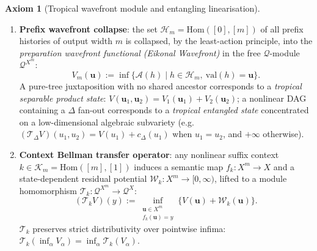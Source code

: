 \documentclass[11pt,a4paper]{article}
\theoremstyle{definition}
\newtheorem{axiom}{Axiom}[section]
\theoremstyle{remark}
\newcommand{\cA}{\mathcal{A}}
\newcommand{\cK}{\mathcal{K}}
\newcommand{\cW}{\mathcal{W}}
\newcommand{\cT}{\mathcal{T}}
\newcommand{\cH}{\mathcal{H}}
\newcommand{\cQ}{\mathcal{Q}}
\begin{document}
\begin{axiom}[Tropical wavefront module and entangling linearisation]
\label{ax:wavefront}
\begin{enumerate}
\item \textbf{Prefix wavefront collapse}: the set
$\cH_m = \mathrm{Hom}([0], [m])$ of all prefix histories of output width $m$ is
collapsed, by the least-action principle, into the \emph{preparation wavefront
functional (Eikonal Wavefront)} in the free $\cQ$-module $\cQ^{X^m}$:
\[
V_m(\mathbf{u}) := \inf \big\{ \cA(h) \mid h \in \cH_m,\ \mathrm{val}(h) =
\mathbf{u} \big\}.
\]
A pure-tree juxtaposition with no shared ancestor corresponds to a \emph{tropical
separable product state}: $V(\mathbf{u}_1, \mathbf{u}_2) = V_1(\mathbf{u}_1) +
V_2(\mathbf{u}_2)$; a nonlinear DAG containing a $\Delta$ fan-out corresponds to a
\emph{tropical entangled state} concentrated on a low-dimensional algebraic
subvariety (e.g.\ $(\cT_\Delta V)(u_1, u_2) = V(u_1) + c_\Delta(u_1)$ when
$u_1 = u_2$, and $+\infty$ otherwise).
\item \textbf{Context Bellman transfer operator}: any nonlinear suffix context
$k \in \cK_m = \mathrm{Hom}([m], [1])$ induces a semantic map $f_k: X^m \to X$
and a state-dependent residual potential $\cW_k: X^m \to [0, \infty)$, lifted to a
module homomorphism $\cT_k : \cQ^{X^m} \to \cQ^X$:
\[
(\cT_k V)(y) := \inf_{\substack{\mathbf{u} \in X^m \\ f_k(\mathbf{u}) = y}}
\big\{ V(\mathbf{u}) + \cW_k(\mathbf{u}) \big\}.
\]
$\cT_k$ preserves strict distributivity over pointwise infima:
$\cT_k(\inf_\alpha V_\alpha) = \inf_\alpha \cT_k(V_\alpha)$.
\end{enumerate}
\end{axiom}
\end{document}
